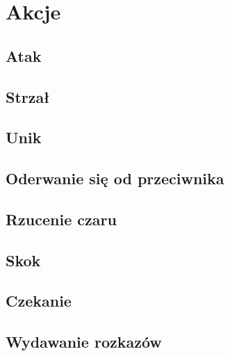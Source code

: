 \chapter{Akcje}

\section{Atak}
 \label{sec:link_ak_Atak}

\section{Strzał}
 \label{sec:link_ak_Strzal}

\section{Unik}
 \label{sec:link_ak_Unik}

\section{Oderwanie się od przeciwnika}
 \label{sec:link_ak_Oderwanie}

\section{Rzucenie czaru}
 \label{sec:link_ak_czar}

\section{Skok}
 \label{sec:link_ak_skok}

\section{Czekanie}
 \label{sec:link_ak_czekanie}

\section{Wydawanie rozkazów}
 \label{sec:link_ak_rozkaz}


